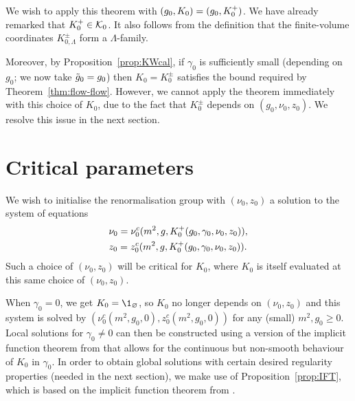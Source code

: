 We wish to apply this theorem with $(g_0, K_0) = (g_0, K^+_0)$.
We have already remarked that $K^+_0 \in \mathcal{K}_0$.
It also follows from the definition that
the finite-volume coordinates $K^\pm_{0,\Lambda}$ form a $\Lambda$-family.

Moreover,
by Proposition~\ref{prop:KWcal}, if
$\gamma_0$ is sufficiently small (depending on $g_0$; we now take $\tilde{g}_0=g_0$)
then $K_0 = K^\pm_0$ satisfies the bound required by Theorem~\ref{thm:flow-flow}.
However, we cannot apply the theorem immediately with this choice
of $K_0$,
due to the fact that $K^\pm_0$
depends on $(g_0, \nu_0, z_0)$.
We resolve this issue in the next section.

\section{Critical parameters}
\label{sec:nu0z0c}

We wish to initialise the renormalisation group with $(\nu_0, z_0)$ a solution
to the system of equations
\begin{align}
&\nu_0 = \nu_0^c(m^2, g, K^+_0(g_0, \gamma_0, \nu_0, z_0)), \label{e:mu0c}
\\
&z_0 = z_0^c(m^2, g, K^+_0(g_0, \gamma_0, \nu_0, z_0)) \label{e:z0c}
.
\end{align}
Such a choice of $(\nu_0, z_0)$ will be critical for $K_0$,
where $K_0$ is itself evaluated at this same choice of $(\nu_0, z_0)$.

When $\gamma_0 = 0$, we get $K_0 = \1_\varnothing$, so $K_0$ no longer depends on $(\nu_0, z_0)$
and this system is solved by $(\nu_0^c(m^2, g_0, 0), z_0^c(m^2, g_0, 0))$
for any (small) $m^2, g_0 \geq 0$.
Local solutions for $\gamma_0 \neq 0$ can then be
constructed using a version of the implicit function theorem from \cite{LS14}
that allows for the continuous but non-smooth behaviour of $K_0$ in $\gamma_0$.
In order to obtain global solutions with certain desired regularity properties
(needed in the next section), we make use of Proposition~\ref{prop:IFT},
which is based on the implicit function theorem from \cite{LS14}.

